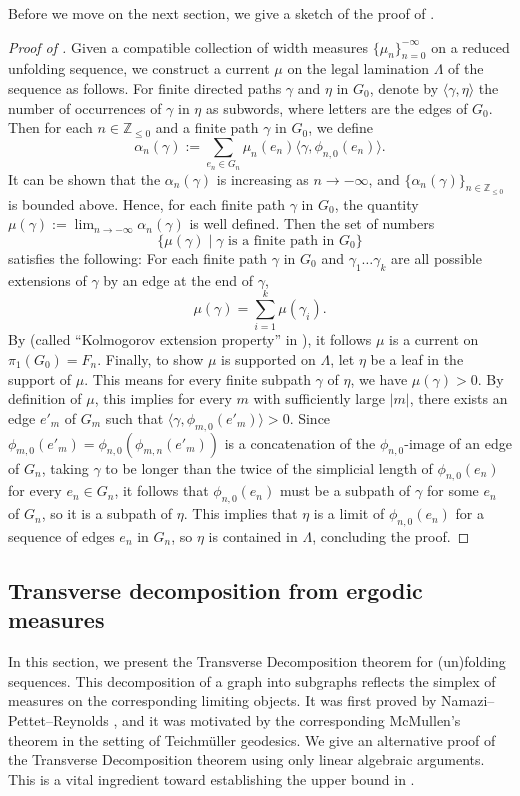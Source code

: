 \documentclass[11pt, letterpaper]{amsart}
\theoremstyle{plain}
\theoremstyle{definition}
\newcommand{\Z}{\mathbb{Z}}
\begin{document}
Before we move on the next section, we give a sketch of the proof of .
\begin{proof}[Proof of ]
    Given a compatible collection of width measures $\{\mu_n\}_{n=0}^{-\infty}$ on a reduced unfolding sequence, we construct a current $\mu$ on the legal lamination $\Lambda$ of the sequence as follows. For finite directed paths $\gamma$ and $\eta$ in $G_0$, denote by $\langle\gamma,\eta\rangle$ the number of occurrences of $\gamma$ in $\eta$ as subwords, where letters are the edges of $G_0$. Then for each $n \in \Z_{\le 0}$ and a finite path $\gamma$ in $G_0$, we define
  \[
    \alpha_n(\gamma):= \sum_{e_n \in G_n} \mu_n(e_n) \langle \gamma, \phi_{n,0}(e_n)\rangle.
  \]
  It can be shown that the $\alpha_n(\gamma)$ is increasing as $n \to -\infty$, and $\{\alpha_n(\gamma)\}_{n \in \Z_{\le 0}}$ is bounded above. Hence, for each finite path $\gamma$ in $G_0$, the quantity $\mu(\gamma):= \lim_{n \to -\infty} \alpha_n(\gamma)$ is well defined. Then the set of numbers 
  \[
  \{\mu(\gamma) \mid \text{$\gamma$ is a finite path in $G_0$}\}
  \]
  satisfies the following: For each finite path $\gamma$ in $G_0$ and $\gamma_1\ldots \gamma_k$ are all possible extensions of $\gamma$ by an edge at the end of $\gamma$,
  \[
    \mu(\gamma) = \sum_{i=1}^k \mu(\gamma_i).
  \]
  By \cite[Lemma 7]{reiner:thesis} (called ``Kolmogorov extension property'' in \cite[Section 2.2]{NPR2014}), it follows $\mu$ is a current on $\pi_1(G_0)=F_n$. Finally, to show $\mu$ is supported on $\Lambda$, let $\eta$ be a leaf in the support of $\mu$. This means for every finite subpath $\gamma$ of $\eta$, we have $\mu(\gamma)>0$. By definition of $\mu$, this implies for every $m$ with sufficiently large $|m|$, there exists an edge $e'_m$ of $G_m$ such that $\langle \gamma, \phi_{m,0}(e'_m) \rangle>0$. Since $\phi_{m,0}(e'_m)=\phi_{n,0}(\phi_{m,n}(e'_m))$ is a concatenation of the $\phi_{n,0}$-image of an edge of $G_n$, taking $\gamma$ to be longer than the twice of the simplicial length of $\phi_{n,0}(e_n)$ for every $e_n \in G_n$, it follows that $\phi_{n,0}(e_n)$ must be a subpath of $\gamma$ for some $e_n$ of $G_n$, so it is a subpath of $\eta$. This implies that $\eta$ is a limit of $\phi_{n,0}(e_n)$ for a sequence of edges $e_n$ in $G_n$, so $\eta$ is contained in $\Lambda$, concluding the proof.
\end{proof}

\subsection{Transverse decomposition from ergodic measures}
\label{ssec:ergodic}
In this section, we present the Transverse Decomposition theorem for
(un)folding sequences. This decomposition of a graph into subgraphs reflects 
the simplex of measures on the corresponding limiting objects. It was first
proved by
Namazi--Pettet--Reynolds \cite{NPR2014}, and it was motivated by
the corresponding McMullen's theorem \cite{mcmullen2013diophantine} in the setting of Teichm\"uller
geodesics. We give an alternative proof of the Transverse
Decomposition theorem 
using only linear algebraic arguments. This is a vital ingredient toward
establishing the upper bound in .
\end{document}
